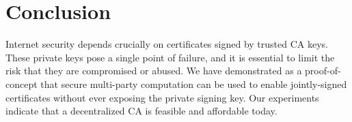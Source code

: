 \section{Conclusion}  \label{sec:conclusion}

Internet security depends crucially on certificates signed by trusted CA keys. These private keys pose a single point of failure, and it is essential to limit the risk that they are compromised or abused. We have demonstrated as a proof-of-concept that secure multi-party computation can be used to enable jointly-signed certificates without ever exposing the private signing key. Our experiments indicate that a decentralized CA is feasible and affordable today. 

